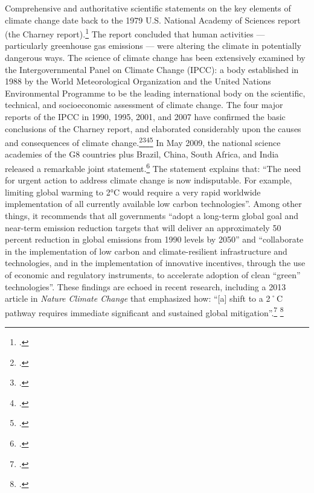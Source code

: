 Comprehensive and authoritative scientific statements on the key elements of climate change date back to the 1979 U.S. National Academy of Sciences report (the Charney report).\footcite[][]{Charney1979}
The report concluded that human activities --- particularly greenhouse gas emissions --- were altering the climate in potentially dangerous ways.
The science of climate change has been extensively examined by the Intergovernmental Panel on Climate Change (IPCC): a body established in 1988 by the World Meteorological Organization and the United Nations Environmental Programme to be the leading international body on the scientific, technical, and socio­economic assessment of climate change.
The four major reports of the IPCC in 1990, 1995, 2001, and 2007 have confirmed the basic conclusions of the Charney report, and elaborated considerably upon the causes and consequences of climate change.\footcite[][]{IPCC1990}\footcite[][]{IPCC1995}\footcite[][]{IPCC2001}\footcite[][]{IPCC2007}
In May 2009, the national science academies of the G8 countries plus Brazil, China, South Africa, and India released a remarkable joint statement.\footcite[][]{G8plusJointStatement}
The statement explains that: ``The need for urgent action to address climate change is now indisputable. For example, limiting global warming to 2°C would require a very rapid worldwide implementation of all currently available low carbon technologies''.
Among other things, it recommends that all governments ``adopt a long-term global goal and near-term emission reduction targets that will deliver an approximately 50 percent reduction in global emissions from 1990 levels by 2050'' and ``collaborate in the implementation of low carbon and climate-resilient infrastructure and technologies, and in the implementation of innovative incentives, through the use of economic and regulatory instruments, to accelerate adoption of clean “green” technologies''.
These findings are echoed in recent research, including a 2013 article in \emph{Nature Climate Change} that emphasized how: ``[a] shift to a 2˚C pathway requires immediate significant and sustained global mitigation''.\footcite[][p. 1]{ChallengeTwoDegrees} \footcite[See also: ][]{EmissionTargetsTwoDegrees}



